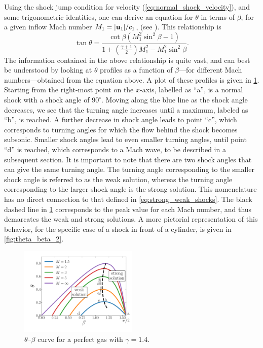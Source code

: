 \documentclass[oneside,a4paper,11pt]{report}
\begin{document}
Using the shock jump condition for velocity (\cref{eq:normal_shock_velocity}), and some trigonometric identities, one can derive an equation for $\theta$ in terms of $\beta$, for a given inflow Mach number $M_1 = |\mathbf{u}_1|/c_1$, (see \cite{thompson1988}). This relationship is
\begin{equation}
    \tan \theta =\dfrac{ \cot \beta \left ( M_1^2 \sin^2 \beta - 1 \right ) }{ 1 + \left ( \frac{\gamma + 1}{2} \right ) M_1^2 - M_1^2 \sin^2 \beta}.
\end{equation}
The information contained in the above relationship is quite vast, and can best be understood by looking at $\theta$ profiles as a function of $\beta$---for different Mach numbers---obtained from the equation above. A plot of these profiles is given in \cref{fig:theta_beta_1}. Starting from the right-most point on the $x$-axis, labelled as ``a'', is a normal shock with a shock angle of $90^\circ$. Moving along the blue line as the shock angle decreases, we see that the turning angle increases until a maximum, labeled as ``b'', is reached. A further decrease in shock angle leads to point ``c'', which corresponds to turning angles for which the flow behind the shock becomes subsonic. Smaller shock angles lead to even smaller turning angles, until point ``d'' is reached, which corresponds to a Mach wave, to be described in a subsequent section. It is important to note that there are two shock angles that can give the same turning angle. The turning angle corresponding to the smaller shock angle is referred to as the weak solution, whereas the turning angle corresponding to the larger shock angle is the strong solution. This nomenclature has no direct connection to that defined in \cref{eq:strong_weak_shocks}. The black dashed line in \cref{fig:theta_beta_1} corresponds to the peak value for each Mach number, and thus demarcates the weak and strong solutions. A more pictorial representation of this behavior, for the specific case of a shock in front of a cylinder, is given in \cref{fig:theta_beta_2}. 
\begin{figure}[ht]
   \centering
   \includegraphics[width=0.5\textwidth]{../../images/theta_beta_1.pdf}
   \caption{$\theta$--$\beta$ curve for a perfect gas with $\gamma = 1.4$.}
   \label{fig:theta_beta_1}
\end{figure}
\end{document}
